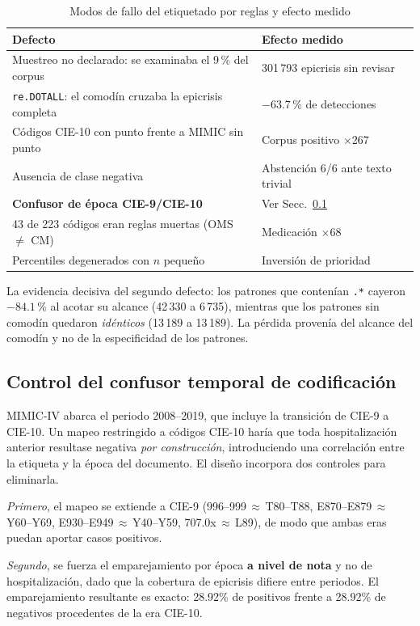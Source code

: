 \documentclass[conference]{IEEEtran}
\begin{document}
\begin{table}[htbp]
\caption{Modos de fallo del etiquetado por reglas y efecto medido}
\label{tab:defectos}
\centering
\footnotesize
\begin{tabular}{@{}p{}p{}@{}}
\toprule
\textbf{Defecto} & \textbf{Efecto medido} \\
\midrule
Muestreo no declarado: se examinaba el 9\,\% del corpus & 301\,793 epicrisis sin revisar \\
\texttt{re.DOTALL}: el comodín cruzaba la epicrisis completa & $-63.7$\,\% de detecciones \\
Códigos CIE-10 con punto frente a MIMIC sin punto & Corpus positivo $\times$267 \\
Ausencia de clase negativa & Abstención 6/6 ante texto trivial \\
\textbf{Confusor de época CIE-9/CIE-10} & Ver Secc.~\ref{sec:atajo} \\
43 de 223 códigos eran reglas muertas (OMS $\neq$ CM) & Medicación $\times$68 \\
Percentiles degenerados con $n$ pequeño & Inversión de prioridad \\
\bottomrule
\end{tabular}
\end{table}

La evidencia decisiva del segundo defecto: los patrones que contenían
\texttt{.*} cayeron $-84.1$\,\% al acotar su alcance (42\,330 a 6\,735),
mientras que los patrones sin comodín quedaron \emph{idénticos}
(13\,189 a 13\,189). La pérdida provenía del alcance del comodín y no de la
especificidad de los patrones.

\subsection{Control del confusor temporal de codificación}
\label{sec:atajo}
MIMIC-IV abarca el periodo 2008--2019, que incluye la transición de CIE-9 a
CIE-10. Un mapeo restringido a códigos CIE-10 haría que toda hospitalización
anterior resultase negativa \emph{por construcción}, introduciendo una
correlación entre la etiqueta y la época del documento. El diseño incorpora dos
controles para eliminarla.

\emph{Primero}, el mapeo se extiende a CIE-9
(996--999\,$\approx$\,T80--T88, E870--E879\,$\approx$\,Y60--Y69,
E930--E949\,$\approx$\,Y40--Y59, 707.0x\,$\approx$\,L89), de modo que ambas eras
puedan aportar casos positivos.

\emph{Segundo}, se fuerza el emparejamiento por época \textbf{a nivel de
nota} y no de hospitalización, dado que la cobertura de epicrisis difiere entre
periodos. El emparejamiento resultante es exacto:
28.92\% de positivos frente a
28.92\% de negativos
procedentes de la era CIE-10.
\end{document}
